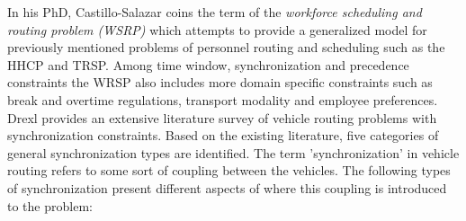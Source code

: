 In his PhD, Castillo-Salazar \cite{castillo_salazar_optimisation_2015} coins the term of the \textit{workforce scheduling and routing problem (WSRP)} which attempts to provide a generalized model for previously mentioned problems of personnel routing and scheduling such as the HHCP and TRSP. Among time window, synchronization and precedence constraints the WRSP also includes more domain specific constraints such as break and overtime regulations, transport modality and employee preferences.\\
Drexl \cite{drexl_synchronization_2012} provides an extensive literature survey of vehicle routing problems with synchronization constraints. Based on the existing literature, five categories of general synchronization types are identified. The term 'synchronization' in vehicle routing refers to some sort of coupling between the vehicles. The following types of synchronization present different aspects of where this coupling is introduced to the problem:
